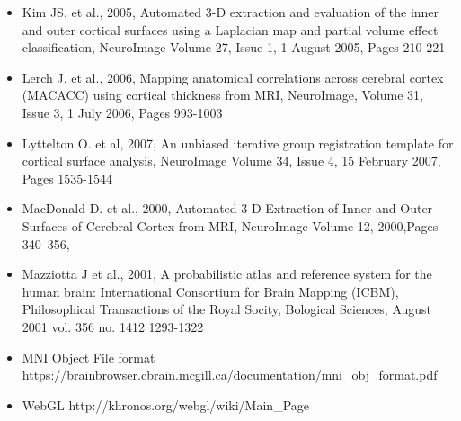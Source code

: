 \documentclass[a4shrink]{baposter}
\begin{document}
\begin{poster}
{  \begin{itemize} \tiny
    \item \tiny Kim JS. et al., 2005, Automated 3-D extraction and evaluation of the inner and outer cortical surfaces using a Laplacian map and partial volume effect classification, NeuroImage Volume 27, Issue 1, 1 August 2005, Pages 210-221
    \item \tiny Lerch J. et al.,  2006,  Mapping anatomical correlations across cerebral cortex (MACACC) using cortical thickness from MRI, NeuroImage, Volume 31, Issue 3, 1 July 2006, Pages 993-1003
    \item \tiny Lyttelton O. et al, 2007, An unbiased iterative group registration template for cortical surface analysis, NeuroImage Volume 34, Issue 4, 15 February 2007, Pages 1535-1544
    \item \tiny MacDonald D. et al., 2000,  Automated 3-D Extraction of Inner and Outer Surfaces of Cerebral Cortex from MRI, NeuroImage Volume 12, 2000,Pages 340–356, 
    \item \tiny Mazziotta J et al., 2001, A probabilistic atlas and reference system for the human brain: International Consortium for Brain Mapping (ICBM), Philosophical Transactions of the Royal Socity, Bological Sciences, August 2001 vol. 356 no. 1412 1293-1322
    \item \tiny MNI Object File format https://brainbrowser.cbrain.mcgill.ca/documentation/mni\_obj\_format.pdf
    \item \tiny WebGL http://khronos.org/webgl/wiki/Main\_Page
  \end{itemize}
}

\end{poster}
\end{document}
